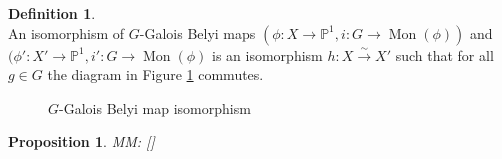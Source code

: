 \documentclass{dcthesis}
\newcommand{\PP}{\mathbb P}
\newcommand{\defi}[1]{\textsf{#1}}
\newcommand{\mm}[1]{{\color{blue} \sf MM: [#1]}}
\DeclareMathOperator{\Mon}{Mon}
\numberwithin{equation}{section}
\newtheorem{prop}[equation]{Proposition}
\theoremstyle{definition}
\newtheorem{definition}[equation]{Definition}
\theoremstyle{remark}
\begin{document}
{{\begin{definition}
\[      \]
      An \defi{isomorphism of $G$-Galois Belyi maps}
      $(\phi\colon X\to\PP^1, i\colon G\to\Mon(\phi))$
      and
      $(\phi'\colon X'\to\PP^1, i'\colon G\to\Mon(\phi)$
      is an isomorphism $h\colon X\stackrel{\sim}{\to} X'$ such that
      for all $g\in G$
      the diagram in
      Figure \ref{fig:Gbelyiiso} commutes.
      \begin{figure}[ht]
        \begin{center}
        \end{center}
        \caption{$G$-Galois Belyi map isomorphism}
        \label{fig:Gbelyiiso}
      \end{figure}
      \begin{prop}\label{prop:Gauts}
        \mm{\cite[Prop. 3.6 ish]{triangles}}
      \end{prop}
    \end{definition}
  }
}
\end{document}
